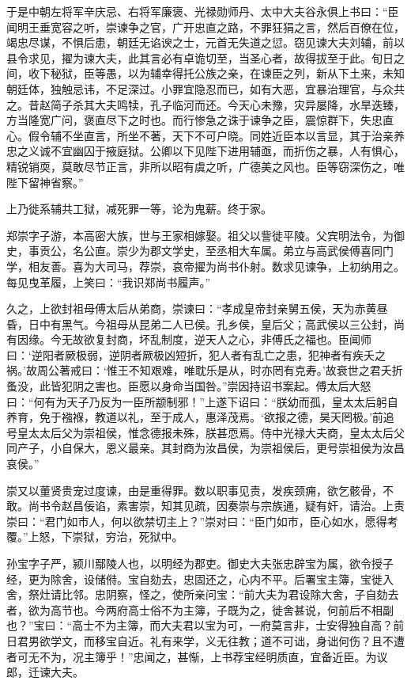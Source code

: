 \documentclass[12pt,UTF8]{ctexbook}
\begin{document}
于是中朝左将军辛庆忌、右将军廉褒、光禄勋师丹、太中大夫谷永俱上书曰：“臣闻明王垂宽容之听，崇谏争之官，广开忠直之路，不罪狂狷之言，然后百僚在位，竭忠尽谋，不惧后患，朝廷无谄谀之士，元首无失道之愆。窃见谏大夫刘辅，前以县令求见，擢为谏大夫，此其言必有卓诡切至，当圣心者，故得拔至于此。旬日之间，收下秘狱，臣等愚，以为辅幸得托公族之亲，在谏臣之列，新从下土来，未知朝廷体，独触忌讳，不足深过。小罪宜隐忍而已，如有大恶，宜暴治理官，与众共之。昔赵简子杀其大夫鸣犊，孔子临河而还。今天心未豫，灾异屡降，水旱迭臻，方当隆宽广问，褒直尽下之时也。而行惨急之诛于谏争之臣，震惊群下，失忠直心。假令辅不坐直言，所坐不著，天下不可户晓。同姓近臣本以言显，其于治亲养忠之义诚不宜幽囚于掖庭狱。公卿以下见陛下进用辅亟，而折伤之暴，人有惧心，精锐销耎，莫敢尽节正言，非所以昭有虞之听，广德美之风也。臣等窃深伤之，唯陛下留神省察。”



上乃徙系辅共工狱，减死罪一等，论为鬼薪。终于家。



郑崇字子游，本高密大族，世与王家相嫁娶。祖父以訾徙平陵。父宾明法令，为御史，事贡公，名公直。崇少为郡文学史，至丞相大车属。弟立与高武侯傅喜同门学，相友善。喜为大司马，荐崇，哀帝擢为尚书仆射。数求见谏争，上初纳用之。每见曳革履，上笑曰：“我识郑尚书履声。”



久之，上欲封祖母傅太后从弟商，崇谏曰：“孝成皇帝封亲舅五侯，天为赤黄昼昏，日中有黑气。今祖母从昆弟二人已侯。孔乡侯，皇后父；高武侯以三公封，尚有因缘。今无故欲复封商，坏乱制度，逆天人之心，非傅氏之福也。臣闻师曰：‘逆阳者厥极弱，逆阴者厥极凶短折，犯人者有乱亡之患，犯神者有疾夭之祸。’故周公著戒曰：‘惟王不知艰难，唯耽乐是从，时亦罔有克寿。’故衰世之君夭折蚤没，此皆犯阴之害也。臣愿以身命当国咎。”崇因持诏书案起。傅太后大怒曰：“何有为天子乃反为一臣所颛制邪！”上遂下诏曰：“朕幼而孤，皇太太后躬自养育，免于襁褓，教道以礼，至于成人，惠泽茂焉。‘欲报之德，昊天罔极。’前追号皇太太后父为崇祖侯，惟念德报未殊，朕甚恧焉。侍中光禄大夫商，皇太太后父同产子，小自保大，恩义最亲。其封商为汝昌侯，为崇祖侯后，更号崇祖侯为汝昌哀侯。”



崇又以董贤贵宠过度谏，由是重得罪。数以职事见责，发疾颈痈，欲乞骸骨，不敢。尚书令赵昌佞谄，素害崇，知其见疏，因奏崇与宗族通，疑有奸，请治。上责崇曰：“君门如市人，何以欲禁切主上？”崇对曰：“臣门如市，臣心如水，愿得考覆。”上怒，下崇狱，穷治，死狱中。



孙宝字子严，颍川鄢陵人也，以明经为郡吏。御史大夫张忠辟宝为属，欲令授子经，更为除舍，设储偫。宝自劾去，忠固还之，心内不平。后署宝主簿，宝徙入舍，祭灶请比邻。忠阴察，怪之，使所亲问宝：“前大夫为君设除大舍，子自劾去者，欲为高节也。今两府高士俗不为主簿，子既为之，徙舍甚说，何前后不相副也？”宝曰：“高士不为主簿，而大夫君以宝为可，一府莫言非，士安得独自高？前日君男欲学文，而移宝自近。礼有来学，义无往教；道不可诎，身诎何伤？且不遭者可无不为，况主簿乎！”忠闻之，甚惭，上书荐宝经明质直，宜备近臣。为议郎，迁谏大夫。
\end{document}
